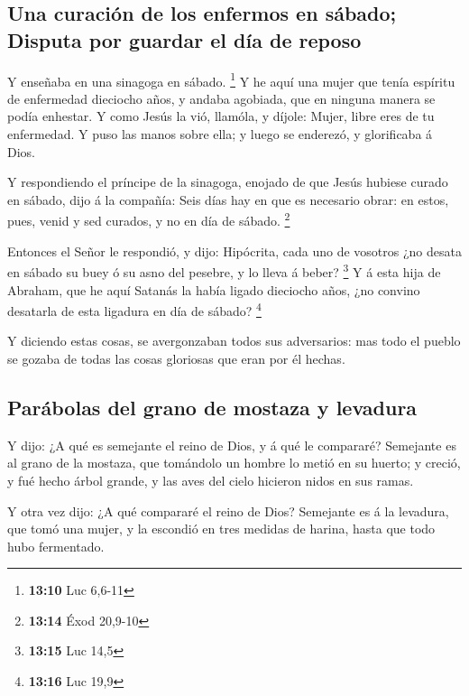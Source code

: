 \hypertarget{una-curaciuxf3n-de-los-enfermos-en-suxe1bado-disputa-por-guardar-el-duxeda-de-reposo}{%
\subsection{Una curación de los enfermos en sábado; Disputa por guardar
el día de
reposo}\label{una-curaciuxf3n-de-los-enfermos-en-suxe1bado-disputa-por-guardar-el-duxeda-de-reposo}}

 Y enseñaba en una sinagoga en sábado. \footnote{\textbf{13:10}
  Luc 6,6-11}  Y he aquí una mujer que tenía espíritu de
enfermedad dieciocho años, y andaba agobiada, que en ninguna manera se
podía enhestar.  Y como Jesús la vió, llamóla, y díjole:
Mujer, libre eres de tu enfermedad.  Y puso las manos
sobre ella; y luego se enderezó, y glorificaba á Dios.

 Y respondiendo el príncipe de la sinagoga, enojado de
que Jesús hubiese curado en sábado, dijo á la compañía: Seis días hay en
que es necesario obrar: en estos, pues, venid y sed curados, y no en día
de sábado. \footnote{\textbf{13:14} Éxod 20,9-10}

 Entonces el Señor le respondió, y dijo: Hipócrita, cada
uno de vosotros ¿no desata en sábado su buey ó su asno del pesebre, y lo
lleva á beber? \footnote{\textbf{13:15} Luc 14,5}  Y á
esta hija de Abraham, que he aquí Satanás la había ligado dieciocho
años, ¿no convino desatarla de esta ligadura en día de sábado?
\footnote{\textbf{13:16} Luc 19,9}

 Y diciendo estas cosas, se avergonzaban todos sus
adversarios: mas todo el pueblo se gozaba de todas las cosas gloriosas
que eran por él hechas.

\hypertarget{paruxe1bolas-del-grano-de-mostaza-y-levadura}{%
\subsection{Parábolas del grano de mostaza y
levadura}\label{paruxe1bolas-del-grano-de-mostaza-y-levadura}}

 Y dijo: ¿A qué es semejante el reino de Dios, y á qué le
compararé?  Semejante es al grano de la mostaza, que
tomándolo un hombre lo metió en su huerto; y creció, y fué hecho árbol
grande, y las aves del cielo hicieron nidos en sus ramas.

 Y otra vez dijo: ¿A qué compararé el reino de Dios?
 Semejante es á la levadura, que tomó una mujer, y la
escondió en tres medidas de harina, hasta que todo hubo fermentado.

